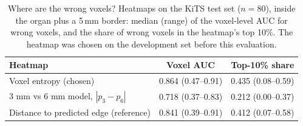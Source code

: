 \begin{table}
\centering\small
\caption{Where are the wrong voxels? Heatmaps on the KiTS test set ($n = 80$), inside the organ plus a 5\,mm border: median (range) of the voxel-level AUC for wrong voxels, and the share of wrong voxels in the heatmap's top 10\%. The heatmap was chosen on the development set before this evaluation.}
\label{tab:heatmaps}
\begin{tabular}{lcc}
\toprule
Heatmap & Voxel AUC & Top-10\% share \\
\midrule
Voxel entropy (chosen) & 0.864 (0.47--0.91) & 0.435 (0.08--0.59) \\
3 mm vs 6 mm model, $|p_3 - p_6|$ & 0.718 (0.37--0.83) & 0.212 (0.00--0.37) \\
Distance to predicted edge (reference) & 0.841 (0.39--0.91) & 0.412 (0.07--0.58) \\
\bottomrule
\end{tabular}
\end{table}
